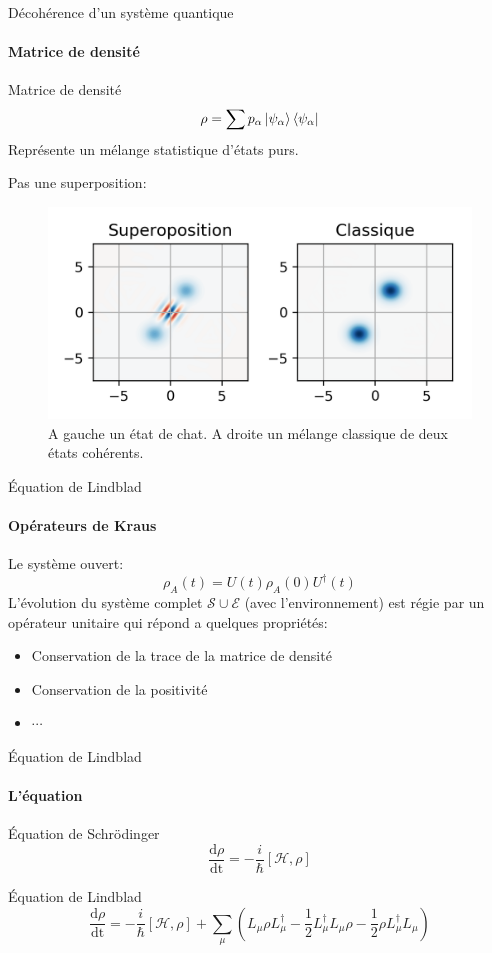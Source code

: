 \documentclass[11pt]{beamer}
\begin{document}
\begin{frame}{Décohérence d'un système quantique}
\framesubtitle{Matrice de densité}
\begin{block}{Matrice de densité}
\[
\rho=\sum p_{\alpha} \ket{\psi_{\alpha}}\bra{\psi_{\alpha}}
\]
Représente un mélange statistique d'états purs.
\end{block}
Pas une superposition:
\begin{figure}
\centering
\includegraphics[width=0.6\linewidth]{pres_wigner_cat_dec}
\caption{A gauche un état de chat. A droite un mélange classique de deux états cohérents.}
\label{fig:preswignercatdec}
\end{figure}
\end{frame}

\begin{frame}{Équation de Lindblad}
\framesubtitle{Opérateurs de Kraus}
Le système ouvert:
\[
\rho_A(t)=U(t)\rho_A(0)U^{\dag}(t)
\]
L'évolution du système complet $\mathcal{S}\cup\mathcal{E}$ (avec l'environnement) est régie par un opérateur unitaire qui répond a quelques propriétés:
\begin{itemize}
\item Conservation de la trace de la matrice de densité
\item Conservation de la positivité
\item $\cdots$
\end{itemize}

\end{frame}

\begin{frame}{Équation de Lindblad}
\framesubtitle{L'équation}
\begin{block}{Équation de Schrödinger}
\[
\frac{\textrm{d}\rho}{\textrm{dt}}=-\frac{i}{\hbar}\left[\mathcal{H},\rho\right]
\]
\end{block}
\begin{block}{Équation de Lindblad}
\[
\frac{\textrm{d}\rho}{\textrm{dt}}=-\frac{i}{\hbar}\left[\mathcal{H},\rho\right]+\sum_{\mu}\left(
	L_{\mu}\rho L_{\mu}^{\dag}-\frac 12 L_{\mu}^{\dag}L_{\mu}\rho -\frac 12 \rho L_{\mu}^{\dag}L_{\mu}
	\right)
\]
\end{block}
\end{frame}
\end{document}
